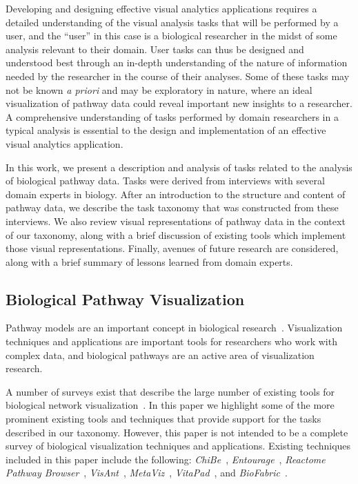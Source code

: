 \documentclass[twocolumn]{bmcart}%
\begin{document}
Developing and designing effective visual analytics applications requires a detailed understanding of the visual analysis tasks that will be performed by a user, and the ``user'' in this case is a biological researcher in the midst of some analysis relevant to their domain.
User tasks can thus be designed and understood best through an in-depth understanding of the nature of information needed by the researcher in the course of their analyses.
Some of these tasks may not be known \emph{a priori} and may be exploratory in nature, where an ideal visualization of pathway data could reveal important new insights to a researcher.
A comprehensive understanding of tasks performed by domain researchers in a typical analysis is essential to the design and implementation of an effective visual analytics application.

In this work, we present a description and analysis of tasks related to the analysis of biological pathway data.
Tasks were derived from interviews with several domain experts in biology.
After an introduction to the structure and content of pathway data, we describe the task taxonomy that was constructed from these interviews.
We also review visual representations of pathway data in the context of our taxonomy, along with a brief discussion of existing tools which implement those visual representations.
Finally, avenues of future research are considered, along with a brief summary of lessons learned from domain experts.

\subsection*{Biological Pathway Visualization}

Pathway models are an important concept in biological research~\cite{cairns2011regulation, luo2003targeting, reya2001stem}.
Visualization techniques and applications are important tools for researchers who work with complex data, and biological pathways are an active area of visualization research.

A number of surveys exist that describe the large number of existing tools for biological network visualization~\cite{Suderman2007tools,pavlopoulos2008survey,Gehlenborg2010omics}.
In this paper we highlight some of the more prominent existing tools and techniques that provide support for the tasks described in our taxonomy.
However, this paper is not intended to be a complete survey of biological visualization techniques and applications.
Existing techniques included in this paper include the following: \textit{ChiBe}~\cite{Babur2010chibe}, \textit{Entourage}~\cite{Lex2013entourage}, \textit{Reactome Pathway Browser}~\cite{croft2014reactome}, \textit{VisAnt}~\cite{hu2004visant}, \textit{MetaViz}~\cite{bourqui2007metabolic}, \textit{VitaPad}~\cite{holford2005vitapad}, and \textit{BioFabric}~\cite{Longabaugh2012biofabric}.
\end{document}
